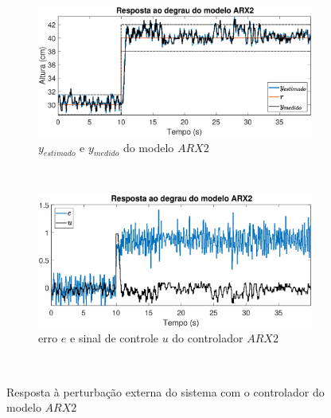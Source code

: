 \begin{figure}[H]
	\centering
	\begin{subfigure}[b]{1\textwidth}
		\includegraphics[width=1\linewidth]{steprarx2y}
		\caption[$y_{estimado}$ e $y_{medido}$ do modelo $ARX2$]{$y_{estimado}$ e $y_{medido}$ do modelo $ARX2$}
		\label{fig:steprarx2y}
	\end{subfigure}
	~ %
	\begin{subfigure}[b]{1\textwidth}
		\includegraphics[width=1\linewidth]{steprarx2e}
		\caption[erro $e$ e sinal de controle $u$ do controlador $ARX2$]{erro $e$ e sinal de controle $u$ do controlador $ARX2$}
		\label{fig:steprarx2e}
	\end{subfigure}
	~ %
	
	\caption{Resposta à perturbação externa do sistema com o controlador do modelo $ARX2$}\label{fig:steprarx2}
\end{figure}

